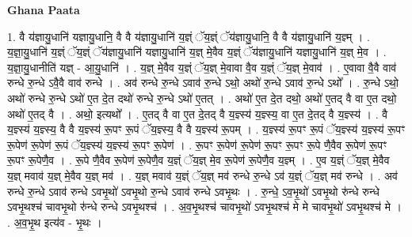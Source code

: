 \documentclass[17pt]{extarticle}
\begin{document}
\textbf{Ghana Paata } \newline

1. वै य॑ज्ञायु॒धानि॑ यज्ञायु॒धानि॒ वै वै य॑ज्ञायु॒धानि॑ य॒ज्ञ्ं ॅय॒ज्ञ्ं ॅय॑ज्ञायु॒धानि॒ वै वै य॑ज्ञायु॒धानि॑ य॒ज्ञ्म् । . य॒ज्ञा॒यु॒धानि॑ य॒ज्ञ्ं ॅय॒ज्ञ्ं ॅय॑ज्ञायु॒धानि॑ यज्ञायु॒धानि॑ य॒ज्ञ् मे॒वैव य॒ज्ञ्ं ॅय॑ज्ञायु॒धानि॑ यज्ञायु॒धानि॑ य॒ज्ञ् मे॒व । . य॒ज्ञा॒यु॒धानीति॑ यज्ञ् - आ॒यु॒धानि॑ । . य॒ज्ञ् मे॒वैव य॒ज्ञ्ं ॅय॒ज्ञ् मे॒वावा वै॒व य॒ज्ञ्ं ॅय॒ज्ञ् मे॒वाव॑ । . ए॒वावा वै॒वै वाव॑ रुन्धे रु॒न्धे ऽवै॒वै वाव॑ रुन्धे । . अव॑ रुन्धे रु॒न्धे ऽवाव॑ रु॒न्धे ऽथो॒ अथो॑ रु॒न्धे ऽवाव॑ रु॒न्धे ऽथो᳚ । . रु॒न्धे ऽथो॒ अथो॑ रुन्धे रु॒न्धे ऽथो॑ ए॒त दे॒त दथो॑ रुन्धे रु॒न्धे ऽथो॑ ए॒तत् । . अथो॑ ए॒त दे॒त दथो॒ अथो॑ ए॒तद् वै वा ए॒त दथो॒ अथो॑ ए॒तद् वै । . अथो॒ इत्यथो᳚ । . ए॒तद् वै वा ए॒त दे॒तद् वै य॒ज्ञ्स्य॑ य॒ज्ञ्स्य॒ वा ए॒त दे॒तद् वै य॒ज्ञ्स्य॑ । . वै य॒ज्ञ्स्य॑ य॒ज्ञ्स्य॒ वै वै य॒ज्ञ्स्य॑ रू॒पꣳ रू॒पं ॅय॒ज्ञ्स्य॒ वै वै य॒ज्ञ्स्य॑ रू॒पम् । . य॒ज्ञ्स्य॑ रू॒पꣳ रू॒पं ॅय॒ज्ञ्स्य॑ य॒ज्ञ्स्य॑ रू॒पꣳ रू॒पेण॑ रू॒पेण॑ रू॒पं ॅय॒ज्ञ्स्य॑ य॒ज्ञ्स्य॑ रू॒पꣳ रू॒पेण॑ । . रू॒पꣳ रू॒पेण॑ रू॒पेण॑ रू॒पꣳ रू॒पꣳ रू॒पे णै॒वैव रू॒पेण॑ रू॒पꣳ रू॒पꣳ रू॒पेणै॒व । . रू॒पे णै॒वैव रू॒पेण॑ रू॒पेणै॒व य॒ज्ञ्ं ॅय॒ज्ञ् मे॒व रू॒पेण॑ रू॒पेणै॒व य॒ज्ञ्म् । . ए॒व य॒ज्ञ्ं ॅय॒ज्ञ् मे॒वैव य॒ज्ञ् मवाव॑ य॒ज्ञ् मे॒वैव य॒ज्ञ् मव॑ । . य॒ज्ञ् मवाव॑ य॒ज्ञ्ं ॅय॒ज्ञ् मव॑ रुन्धे रु॒न्धे ऽव॑ य॒ज्ञ्ं ॅय॒ज्ञ् मव॑ रुन्धे । . अव॑ रुन्धे रु॒न्धे ऽवाव॑ रुन्धे ऽवभृ॒थो॑ ऽवभृ॒थो रु॒न्धे ऽवाव॑ रुन्धे ऽवभृ॒थः । . रु॒न्धे॒ ऽव॒भृ॒थो॑ ऽवभृ॒थो रु॑न्धे रुन्धे ऽवभृ॒थश्च॑ चावभृ॒थो रु॑न्धे रुन्धे ऽवभृ॒थश्च॑ । . अ॒व॒भृ॒थश्च॑ चावभृ॒थो॑ ऽवभृ॒थश्च॑ मे मे चावभृ॒थो॑ ऽवभृ॒थश्च॑ मे । . अ॒व॒भृ॒थ इत्य॑व - भृ॒थः । \newline
\end{document}
